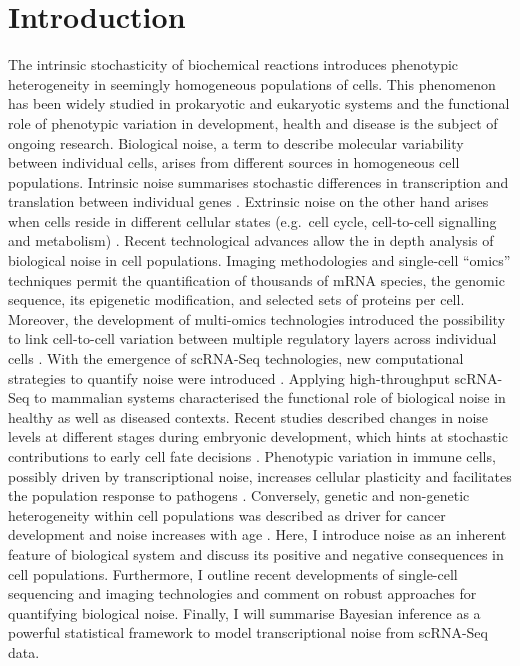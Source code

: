 
\chapter{Introduction}  

\graphicspath{{"../../Dropbox (Cambridge  University)/Figures_for_thesis/Introduction/"}}

\begin{Abstract}
The intrinsic stochasticity of biochemical reactions introduces phenotypic heterogeneity in seemingly homogeneous populations of cells. This phenomenon has been widely studied in prokaryotic and eukaryotic systems and the functional role of phenotypic variation in development, health and disease is the subject of ongoing research. Biological noise, a term to describe molecular variability between individual cells, arises from different sources in homogeneous cell populations. Intrinsic noise summarises stochastic differences in transcription and translation between individual genes \citep{Elowitz2002, Raser2004, Sanchez2013}. Extrinsic noise on the other hand arises when cells reside in different cellular states (e.g.~cell cycle, cell-to-cell signalling and metabolism)  \citep{Zopf2013, Iwamoto2016, Kiviet2014}. Recent technological advances allow the in depth analysis of biological noise in cell populations. Imaging methodologies \citep{Moffitt2016a} and single-cell “omics” techniques \citep{Bock2016} permit the quantification of thousands of mRNA species, the genomic sequence, its epigenetic modification, and selected sets of proteins per cell. Moreover, the development of multi-omics technologies introduced the possibility to link cell-to-cell variation between multiple regulatory layers across individual cells \citep{Macaulay2017}. With the emergence of \gls{scRNA-Seq} technologies, new computational strategies to quantify noise were introduced \cite{Brennecke2013, Vallejos2015, Kolodziejczyk2015cell, Buettner2015, Fan2015a, Richard2016}. Applying high-throughput scRNA-Seq to mammalian systems characterised the functional role of biological noise in healthy as well as diseased contexts. Recent studies described changes in noise levels at different stages during embryonic development, which hints at stochastic contributions to early cell fate decisions \citep{Goolam2016, Mohammed2017, Ohnishi2014}. Phenotypic variation in immune cells, possibly driven by transcriptional noise, increases cellular plasticity and facilitates the population response to pathogens \citep{Shalek2014, Kellogg2015a}. Conversely, genetic and non-genetic heterogeneity within cell populations was described as driver for cancer development \citep{Marusyk2012} and noise increases with age \citep{Martinez-jimenez2017, Enge2017}. Here, I introduce noise as an inherent feature of biological system and discuss its positive and negative consequences in cell populations. Furthermore, I outline recent developments of single-cell sequencing and imaging technologies and comment on robust approaches for quantifying biological noise. Finally, I will summarise Bayesian inference as a powerful statistical framework to model transcriptional noise from \gls{scRNA-Seq} data.

\end{Abstract}

